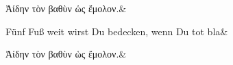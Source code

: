 \documentclass[ngerman,fontsize=10pt]{scrartcl}
\begin{document}
  \begin{pages}
    \begin{Leftside}
      \beginnumbering
      \begin{otherlanguage}{greek}
        \stanza
         Ἀίδην τὸν βαθὺν ὡς ἔμολον.\&
      \end{otherlanguage}
      \endnumbering
    \end{Leftside}
    \begin{Rightside}
      \beginnumbering
      \stanza Fünf Fuß weit wirst Du bedecken, wenn Du tot
      bla\&
      \endnumbering
    \end{Rightside}
  \end{pages}
  \Pages

\beginnumbering
\stanza
         Ἀίδην τὸν βαθὺν ὡς ἔμολον.\&
              \endnumbering
\end{document}

